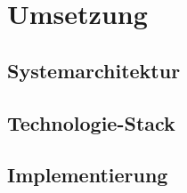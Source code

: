 \chapter{Umsetzung}

\section{Systemarchitektur}

\section{Technologie-Stack}

\section{Implementierung}